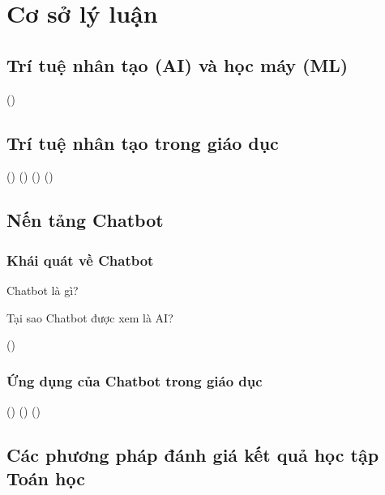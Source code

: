 \chapter{Cơ sở lý luận}

\section{Trí tuệ nhân tạo (AI) và học máy (ML)}
(\cite{nguyen2018tri})


\section{Trí tuệ nhân tạo trong giáo dục}
(\cite{garito1991artificial})
(\cite{beck1996applications})
(\cite{goksel2019artificial})
(\cite{devedvzic2004web})

\section{Nến tảng Chatbot}
\subsection{Khái quát về Chatbot}
Chatbot là gì?\par
Tại sao Chatbot được xem là AI?\par
(\cite{bii2013chatbot})
\subsection{Ứng dụng của Chatbot trong giáo dục}
(\cite{10.1007/978-3-030-01689-0_23})
(\cite{hoang2011ung})
(\cite{hsu2012mobile})

\section{Các phương pháp đánh giá kết quả học tập Toán học}

